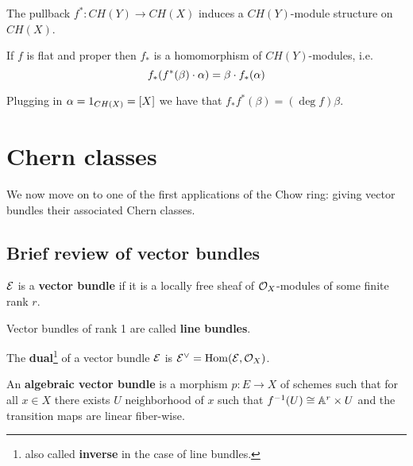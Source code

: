 \begin{remark}
The pullback $f^\ast:CH(Y)\to CH(X)$ induces a $CH(Y)$-module structure on $CH(X)$.
\end{remark}



\begin{proposition}[]
If $f$ is flat and proper then $f_\ast$ is a homomorphism of $CH(Y)$-modules, i.e.
\[f_\ast(f^\ast(\beta)\cdot \alpha)=\beta\cdot f_\ast(\alpha)\]
\end{proposition}


\begin{remark}
Plugging in $\alpha=1_{CH(X)}=[X]$ we have that $f_\ast f^\ast(\beta)=(\deg f)\beta$.
\end{remark}















\section{Chern classes}
We now move on to one of the first applications of the Chow ring: giving vector bundles their associated Chern classes.

\subsection{Brief review of vector bundles}
\begin{definition}[]
$\mathcal{E}$ is a \textbf{vector bundle} if it is a locally free sheaf of $\mathcal{O}_X$-modules of some finite rank $r$.
\end{definition}

\begin{remark}
Vector bundles of rank 1 are called \textbf{line bundles}.
\end{remark}

\begin{definition}[]
The \textbf{dual}\footnote{also called \textbf{inverse} in the case of line bundles.} of a vector bundle $\mathcal{E}$ is $\mathcal{E}^\vee=\operatorname{Hom}(\mathcal{E},\mathcal{O}_X)$.
\end{definition}

\begin{definition}[]
An \textbf{algebraic vector bundle} is a morphism $p:E\to X$ of schemes such that for all $x\in X$ there exists $U$ neighborhood of $x$ such that $f^{-1}(U)\cong \mathbb{A}^r\times U$ and the transition maps are linear fiber-wise.
\end{definition}

